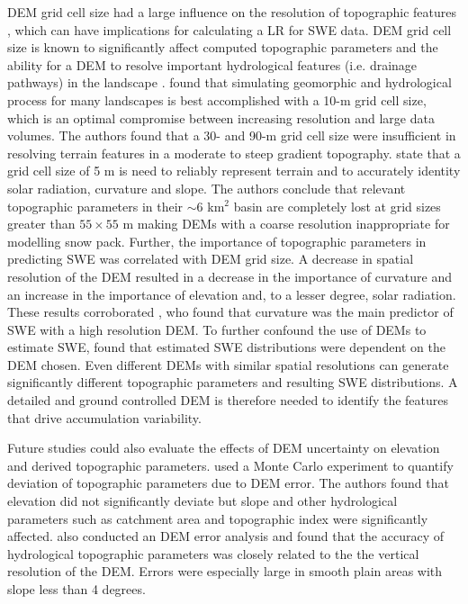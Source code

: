 \documentclass[twocolumn,letterpaper]{igs}
\begin{document}
DEM grid cell size had a large influence on the resolution of topographic features \citep{Lopez2010}, which can have implications for calculating a LR for SWE data. DEM grid cell size is known to significantly affect computed topographic parameters and the ability for a DEM to resolve important hydrological features (i.e. drainage pathways) in the landscape \citep{Zhang1994, Garbrecht1994, Guo-an2001}. \cite{Zhang1994} found that simulating geomorphic and hydrological process for many landscapes is best accomplished with a 10-m grid cell size, which is an optimal compromise between increasing resolution and large data volumes. The authors found that a 30- and 90-m grid cell size were insufficient in resolving terrain features in a  moderate to steep gradient topography. \cite{Lopez2010} state that a grid cell size of 5 m is need to reliably represent terrain and to accurately identity solar radiation, curvature and slope. The authors conclude that relevant topographic parameters in their $\sim$6 km$^2$ basin are completely lost at grid sizes greater than $55\times55$ m making DEMs with a coarse resolution inappropriate for modelling snow pack. Further, the importance of topographic parameters in predicting SWE was correlated with DEM grid size. A decrease in spatial resolution of the DEM resulted in a decrease in the importance of curvature and an increase in the importance of elevation and, to a lesser degree, solar radiation. These results corroborated \cite{Kienzle2004}, who found that curvature was the main predictor of SWE with a high resolution DEM. To further confound the use of DEMs to estimate SWE, \cite{Molotch2005} found that estimated SWE distributions were dependent on the DEM chosen. Even different DEMs with similar spatial resolutions can generate significantly different topographic parameters and resulting SWE distributions. A detailed and ground controlled DEM is therefore needed to identify the features that drive accumulation variability. 

Future studies could also evaluate the effects of DEM uncertainty on elevation and derived topographic parameters. \cite{Wechsler2006} used a Monte Carlo experiment to quantify deviation of topographic parameters due to DEM error. The authors found that elevation did not significantly deviate but slope and other hydrological parameters such as catchment area and topographic index were significantly affected. \cite{Guo-an2001} also conducted an DEM error analysis and found that the accuracy of hydrological topographic parameters was closely related to the the vertical resolution of the DEM. Errors were especially large in smooth plain areas with slope less than 4 degrees.
\end{document}
